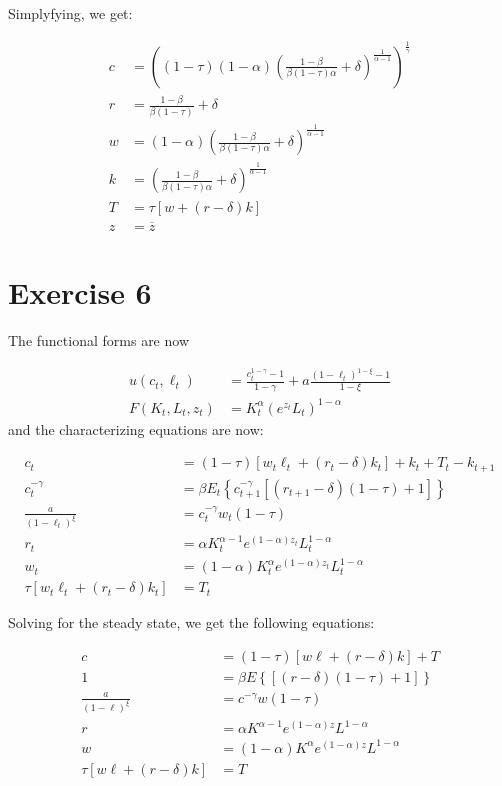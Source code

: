 \documentclass[11pt]{article}
\numberwithin{equation}{section}
\theoremstyle{plain}
\theoremstyle{definition}
\newcommand\parens[1]{\left( #1 \right)}
\newcommand{\1}{\mathbbm 1}
\def\a{\alpha}
\def\b{\beta}
\def\g{\gamma}
\def\d{\delta}
\def\t{\tau}
\begin{document}
Simplyfying, we get:

\begin{align}
c&= \parens{(1 - \t)(1-\a) \parens{\frac{1-\b}{\b (1 - \t) \a} + \d}^{\frac{1}{\a - 1}}}^{\frac{1}{\g}} \\
r&= \frac{1-\b}{\b (1 - \t)} + \d \\
w&=(1-\a)\parens{\frac{1-\b}{\b (1 - \t) \a} + \d}^{\frac{1}{\a - 1}} \\
k&=\parens{\frac{1-\b}{\b (1 - \t) \a} + \d}^{\frac{1}{\a - 1}} \\
T &=\tau\left[w+\left(r-\delta\right) k\right]\\
z&=\overline{z}
\end{align}

\section{Exercise 6}

The functional forms are now 

\begin{align} 
 u\left(c_{t}, \ell_{t}\right) &=\frac{c_{t}^{1-\gamma}-1}{1-\gamma}+a \frac{\left(1-\ell_{t}\right)^{1-\xi}-1}{1-\xi} \\ 
  F\left(K_{t}, L_{t}, z_{t}\right) &= K_{t}^{\alpha} \parens{e^{z_{t}} L_{t}}^{1-\alpha} 
 \end{align}
and the characterizing equations are now:

\begin{align}
c_{t}&=(1-\tau)\left[w_{t} \ell_{t}+\left(r_{t}-\delta\right) k_{t}\right]+k_{t}+T_{t}-k_{t+1} \\
c_t^{-\g}&=\beta E_{t}\left\{c_{t+1}^{-\g}\left[\left(r_{t+1}-\delta\right)(1-\tau)+1\right]\right\} \\
\frac{a}{(1-\ell_t)^{\xi}}&=c_t^{-\g} w_{t}(1-\tau) \\
r_{t}&=\a K_{t}^{\alpha - 1} e^{(1-\alpha)z_{t}}L_t^{1-\a}\\
w_{t}&=(1-\a)K_{t}^{\alpha} e^{(1- \alpha) z_{t}}L_t^{1-\a} \\
\tau\left[w_{t} \ell_{t}+\left(r_{t}-\delta\right) k_{t}\right]&=T_t
\end{align}

Solving for the steady state, we get the following equations:

\begin{align}
c&=(1-\tau)\left[w \ell+\left(r-\delta\right) k\right]+T \\
1&=\beta E\left\{\left[\left(r-\delta\right)(1-\tau)+1\right]\right\} \\
\frac{a}{(1-\ell)^{\xi}}&=c^{-\g} w(1-\tau) \\
r&=\a K^{\alpha - 1} e^{(1-\alpha)z}L^{1-\a}\\
w&=(1-\a)K^{\alpha} e^{(1- \alpha) z}L^{1-\a} \\
\tau\left[w \ell+\left(r-\delta\right) k\right]&=T
\end{align}
\end{document}

